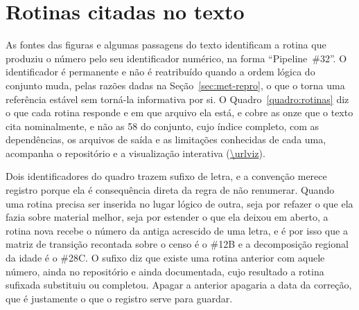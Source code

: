 %
%
\chapter{Rotinas citadas no texto}
\label{ap:rotinas}

As fontes das figuras e algumas passagens do texto identificam a rotina que
produziu o número pelo seu identificador numérico, na forma
``Pipeline~\#32''. O identificador é permanente e não é reatribuído quando a
ordem lógica do conjunto muda, pelas razões dadas na
Seção~\ref{sec:met-repro}, o que o torna uma referência estável sem torná-la
informativa por si. O Quadro~\ref{quadro:rotinas} diz o que cada rotina
responde e em que arquivo ela está, e cobre as onze que o texto cita
nominalmente, e não as 58 do conjunto, cujo índice completo, com as
dependências, os arquivos de saída e as limitações conhecidas de cada uma,
acompanha o repositório e a visualização interativa (\url{\urlviz}).

Dois identificadores do quadro trazem sufixo de letra, e a convenção merece
registro porque ela é consequência direta da regra de não renumerar. Quando
uma rotina precisa ser inserida no lugar lógico de outra, seja por refazer o
que ela fazia sobre material melhor, seja por estender o que ela deixou em
aberto, a rotina nova recebe o número da antiga acrescido de uma letra, e é
por isso que a matriz de transição recontada sobre o censo é o \#12B e a
decomposição regional da idade é o \#28C. O sufixo diz que existe uma rotina
anterior com aquele número, ainda no repositório e ainda documentada, cujo
resultado a rotina sufixada substituiu ou completou. Apagar a anterior
apagaria a data da correção, que é justamente o que o registro serve para
guardar.

